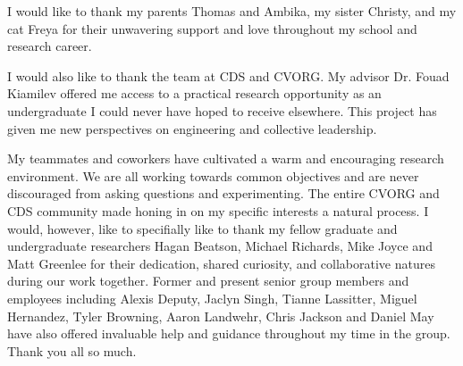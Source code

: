 I would like to thank my parents Thomas and Ambika, my sister Christy, and my cat Freya for their unwavering support and love throughout my school and research career. \par
I would also like to thank the team at CDS and CVORG. My advisor Dr. Fouad Kiamilev offered me access to a practical research opportunity as an undergraduate I could never have hoped to receive elsewhere. This project has given me new perspectives on engineering and collective leadership. \par
My teammates and coworkers have cultivated a warm and encouraging research environment. We are all working towards common objectives and are never discouraged from asking questions and experimenting. The entire CVORG and CDS community made honing in on my specific interests a natural process. I would, however, like to specifially like to thank my fellow graduate and undergraduate researchers Hagan Beatson, Michael Richards, Mike Joyce and Matt Greenlee for their dedication, shared curiosity, and collaborative natures during our work together. Former and present senior group members and employees including Alexis Deputy, Jaclyn Singh, Tianne Lassitter, Miguel Hernandez, Tyler Browning, Aaron Landwehr, Chris Jackson and Daniel May have also offered invaluable help and guidance throughout my time in the group. Thank you all so much.